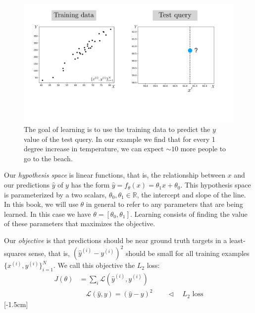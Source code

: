 \begin{figure}[h]
    \centerline{
    \includegraphics[width=0.7\linewidth]{./figures/intro_to_learning/ols_train_test.pdf}
    }
    \caption{The goal of learning is to use the training data to predict the $y$ value of the test query. In our example we find that for every 1 degree increase in temperature, we can expect $\sim 10$ more people to go to the beach.}
    \label{fig:intro_to_learning:ols_train_test}
\end{figure}

Our \emph{hypothesis space} is linear functions, that is, the relationship between $x$ and our predictions $\hat{y}$ of $y$ has the form $\hat{y} = f_{\theta}(x) = \theta_1 x + \theta_0$. This hypothesis space is parameterized by a two scalars, $\theta_0, \theta_1 \in \mathbb{R}$, the intercept and slope of the line. In this book, we will use $\theta$ in general to refer to any parameters that are being learned. In this case we have $\theta = [\theta_0, \theta_1]$. Learning consists of finding the value of these parameters that maximizes the objective.

Our \emph{objective} is that predictions should be near ground truth targets in a least-squares sense, that is, $(\hat{y}^{(i)} - y^{(i)})^2$ should be small for all training examples $\{x^{(i)}, y^{(i)}\}_{i=1}^N$. We call this objective the $L_2$ loss:
\begin{align}
    J(\theta) &= \sum_i \mathcal{L}(\hat{y}^{(i)}, y^{(i)})\\
    &\quad \mathcal{L}(\hat{y}, y) = (\hat{y} - y)^2 \quad\quad \triangleleft \quad L_2 \text{ loss}
\end{align}
[-1.5cm]%

